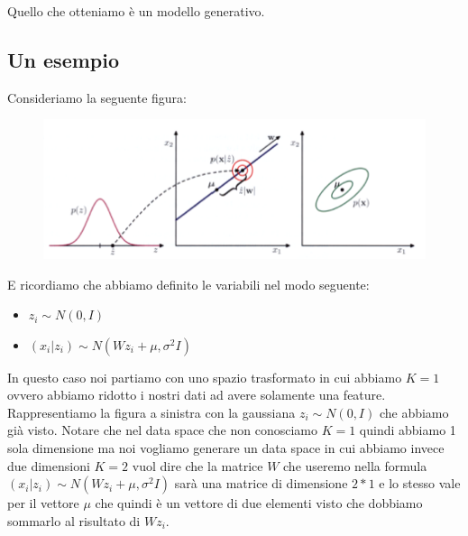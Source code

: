 \documentclass[14pt]{extreport}
\begin{document}
Quello che otteniamo è un modello generativo.

\subsection{Un esempio}

Consideriamo la seguente figura:


\begin{figure}[H]
	\centering
	\includegraphics[width=0.7\linewidth]{483.jpeg}
\end{figure}

E ricordiamo che abbiamo definito le variabili nel modo seguente:

\begin{itemize}
	\item $z_i \sim N(0, I)$
	\item $(x_i | z_i) \sim N(Wz_i + \mu, \sigma^2I)$
\end{itemize}

In questo caso noi partiamo con uno spazio trasformato in cui abbiamo $K=1$ ovvero abbiamo ridotto i nostri dati ad avere solamente una feature.
Rappresentiamo la figura a sinistra con la gaussiana $z_i \sim N(0, I)$ che abbiamo già visto. Notare che nel data space che non conosciamo $K=1$
quindi abbiamo 1 sola dimensione ma noi vogliamo generare un data space in cui abbiamo invece due dimensioni $K=2$ vuol dire che la matrice $W$ che
useremo nella formula $(x_i | z_i) \sim N(Wz_i + \mu, \sigma^2I)$ sarà una matrice di dimensione $2*1$ e lo stesso vale per il vettore $\mu$ che
quindi è un vettore di due elementi visto che dobbiamo sommarlo al risultato di $Wz_i$.
\end{document}
